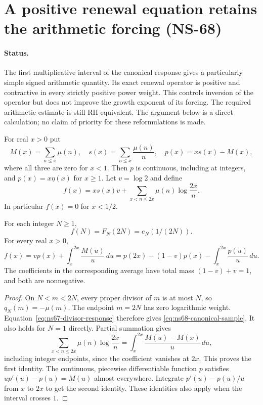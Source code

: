 \section{A positive renewal equation retains the arithmetic forcing (NS-68)}
\label{sec:ns68-renewal}

\paragraph{Status.}
The first multiplicative interval of the canonical response gives a
particularly simple signed arithmetic quantity. Its exact renewal
operator is positive and contractive in every strictly positive power
weight. This controls inversion of the operator but does not improve
the growth exponent of its forcing. The required arithmetic estimate
is still RH-equivalent. The argument below is a direct calculation;
no claim of priority for these reformulations is made.

For real $x>0$ put
\[
 M(x)=\sum_{n\leq x}\mu(n),\quad s(x)=\sum_{n\leq x}\frac{\mu(n)}n,
 \quad p(x)=x s(x)-M(x),
\]
where all three are zero for $x<1$. Then $p$ is continuous, including
at integers, and $p(x)=x\eta(x)$ for $x\geq1$.
Let $v=\log2$ and define
\begin{equation}
 f(x)=x s(x)v+\sum_{x<n\leq2x}\mu(n)\log\frac{2x}{n}.
 \label{eq:ns68-forcing}
\end{equation}
In particular $f(x)=0$ for $x<1/2$.

\begin{proposition}
\label{prop:ns68-renewal}
For each integer $N\geq1$,
\begin{equation}
 f(N)=F_N(2N)=e_N(1/(2N)).
 \label{eq:ns68-canonical-sample}
\end{equation}
For every real $x>0$,
\begin{equation}
 f(x)=v p(x)+\int_x^{2x}\frac{M(u)}u\,du
     =p(2x)-(1-v)p(x)-\int_x^{2x}\frac{p(u)}u\,du.
 \label{eq:ns68-renewal-identity}
\end{equation}
The coefficients in the corresponding average have total mass
$(1-v)+v=1$, and both are nonnegative.
\end{proposition}
\begin{proof}
On $N<m<2N$, every proper divisor of $m$ is at most $N$, so
$q_N(m)=-\mu(m)$. The endpoint $m=2N$ has zero logarithmic weight.
Equation~\eqref{eq:ns67-divisor-response} therefore gives
\eqref{eq:ns68-canonical-sample}. It also holds for $N=1$ directly.
Partial summation gives
\[
 \sum_{x<n\leq2x}\mu(n)\log\frac{2x}{n}
       =\int_x^{2x}\frac{M(u)-M(x)}u\,du,
\]
including integer endpoints, since the coefficient vanishes at $2x$.
This proves the first identity. The continuous, piecewise differentiable
function $p$ satisfies $u p'(u)-p(u)=M(u)$ almost everywhere. Integrate
$p'(u)-p(u)/u$ from $x$ to $2x$ to get the second identity. These
identities also apply when the interval crosses $1$.
\end{proof}

